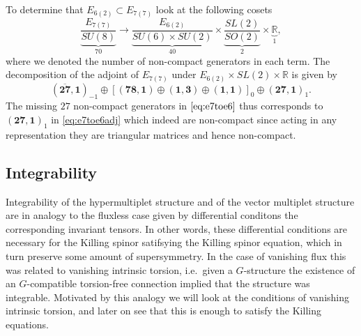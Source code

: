 To determine that $E_{6(2)}\subset E_{7(7)}$ look at the following cosets 
\begin{equation}\label{eq:e7toe6}
    \underbrace{\frac{E_{7(7)}}{SU(8)}}_{70}\to\underbrace{\frac{E_{6(2)}}{SU(6)\times SU(2)}}_{40}\times \underbrace{\frac{SL(2)}{SO(2)}}_{2}\times \underbrace{\mathbb{R}}_{1},
\end{equation}
where we denoted the number of non-compact generators in each term. The decomposition of the adjoint of $E_{7(7)}$ under $E_{6(2)}\times SL(2)\times \mathbb{R}$ is given by 
\begin{equation}\label{eq:e7toe6adj}
    (\overbar{\mathbf{27}},\mathbf{1})_{-1}\oplus\left[(\mathbf{78},\mathbf{1})\oplus(\mathbf{1},\mathbf{3})\oplus(\mathbf{1},\mathbf{1})\right]_0\oplus(\mathbf{27},\mathbf{1})_{1}.
\end{equation}
The missing $27$ non-compact generators in $\eqref{eq:e7toe6}$ thus corresponds to $(\mathbf{27},\mathbf{1})_{1}$ in \eqref{eq:e7toe6adj} which indeed are non-compact since acting in any representation they are triangular matrices and hence non-compact. 


\subsection{Integrability}

Integrability of the hypermultiplet structure and of the vector multiplet structure are in analogy to the fluxless case given by differential conditons the corresponding invariant tensors. In other words, these differential conditions are necessary for the Killing spinor satifsying the Killing spinor equation, which in turn preserve some amount of supersymmetry. In the case of vanishing flux this was related to vanishing intrinsic torsion, i.e.\ given a $G$-structure the existence of an $G$-compatible torsion-free connection implied that the structure was integrable. Motivated by this analogy we will look at the conditions of vanishing intrinsic torsion, and later on see that this is enough to satisfy the Killing equations. 
